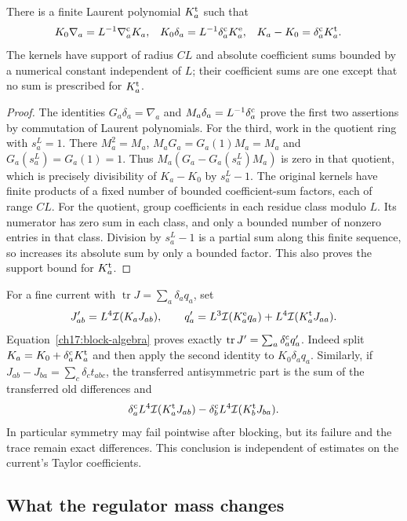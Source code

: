 \begin{lemma}
\label{ch17:block-identities}
There is a finite Laurent polynomial $K_a^{\rm t}$ such that
\begin{align}
 K_0\nabla_a&=L^{-1}\nabla_a^{\rm c}K_a,&
 K_0\delta_a&=L^{-1}\delta_a^{\rm c}K_a^{\rm e},&
 K_a-K_0&=\delta_a^{\rm c}K_a^{\rm t}.
 \label{ch17:block-algebra}
\end{align}
The kernels have support of radius $CL$ and absolute coefficient sums
bounded by a numerical constant independent of $L$; their coefficient sums are one
except that no sum is prescribed for $K_a^{\rm t}$.
\end{lemma}
\begin{proof}
The identities $G_a\delta_a=\nabla_a$ and
$M_a\delta_a=L^{-1}\delta_a^{\rm c}$ prove the first two assertions
by commutation of Laurent polynomials. For the third, work in the
quotient ring with $s_a^L=1$. There $M_a^2=M_a$,
$M_aG_a=G_a(1)M_a=M_a$ and $G_a(s_a^L)=G_a(1)=1$.
Thus $M_a(G_a-G_a(s_a^L)M_a)$ is zero in that quotient, which is
precisely divisibility of $K_a-K_0$ by $s_a^L-1$.
The original kernels have finite products of a fixed number of bounded
coefficient-sum factors, each of range $CL$. For the quotient, group
coefficients in each residue class modulo $L$. Its numerator has zero
sum in each class, and only a bounded number of nonzero entries in that
class. Division by $s_a^L-1$ is a partial sum along this finite sequence,
so increases its absolute sum by only a bounded factor. This also proves
the support bound for $K_a^{\rm t}$.
\end{proof}

For a fine current with $\operatorname{tr}J=\sum_a\delta_aq_a$, set
\[
 J'_{ab}=L^4\mathcal I(K_aJ_{ab}),\qquad
 q'_a=L^3\mathcal I(K_a^{\rm e}q_a)
                       +L^4\mathcal I(K_a^{\rm t}J_{aa}).
\]
Equation~\eqref{ch17:block-algebra} proves exactly
$\operatorname{tr}J'=\sum_a\delta_a^{\rm c}q'_a$.
Indeed split $K_a=K_0+\delta_a^{\rm c}K_a^{\rm t}$ and then apply
the second identity to $K_0\delta_aq_a$.
Similarly, if $J_{ab}-J_{ba}=\sum_c\delta_ct_{abc}$, the transferred
antisymmetric part is the sum of the transferred old differences and
\[
 \delta_a^{\rm c} L^4\mathcal I(K_a^{\rm t}J_{ab})
 -\delta_b^{\rm c} L^4\mathcal I(K_b^{\rm t}J_{ba}).
\]
In particular symmetry may fail pointwise after blocking, but its failure
and the trace remain exact differences. This conclusion is independent
of estimates on the current's Taylor coefficients.

\subsection{What the regulator mass changes}

